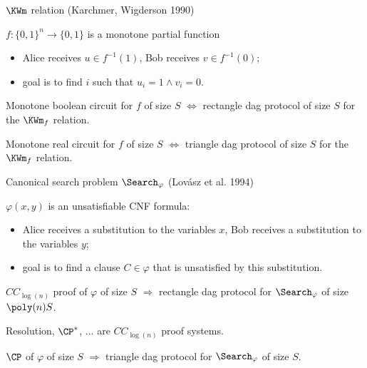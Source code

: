 \begin{frame}{$\KWm$ relation (Karchmer, Wigderson 1990)}

    $f:\{0, 1\}^n \to \{0, 1\}$ is a monotone partial function
    
    \begin{itemize}
        \item Alice receives $u \in f^{-1}(1)$, Bob receives $v \in f^{-1}(0)$;
        \item goal is to find $i$ such that $u_i = 1 \land v_i = 0$.
    \end{itemize}

    \pause

    \begin{theorem}
        Monotone boolean circuit for $f$ of size $S$ $\Leftrightarrow$ rectangle dag protocol of size $S$
        for the $\KWm_f$ relation.
    \end{theorem}

    \pause

    \begin{theorem}
        Monotone real circuit for $f$ of size $S$ $\Leftrightarrow$ triangle dag protocol of size $S$
        for the $\KWm_f$ relation.
    \end{theorem}
\end{frame}


\begin{frame}{Canonical search problem $\Search_{\varphi}$ (Lov{\'{a}}sz et al. 1994)}
    
    $\varphi(x, y)$ is an unsatisfiable CNF formula:
    \begin{itemize}
        \item Alice receives a substitution to the variables $x$, Bob receives a substitution to the
            variables $y$;
        \item goal is to find a clause $C \in \varphi$ that is unsatisfied by this substitution.
    \end{itemize}

    \pause

    \begin{theorem}[Kraj{\'{\i}}{\v{c}}ek 95; S 17]
        $CC_{\log(n)}$ proof of $\varphi$ of size $S$ $\Rightarrow$ rectangle dag protocol for
        $\Search_{\varphi}$ of size $\poly(n) S$.
    \end{theorem}

    Resolution, $\CP^*$, $\dots$ are $CC_{\log(n)}$ proof systems.

    \pause
    
    \begin{theorem}[S 17]
        $\CP$ of $\varphi$ of size $S$ $\Rightarrow$ triangle dag protocol for $\Search_{\varphi}$ of
        size $S$.
    \end{theorem}
\end{frame}